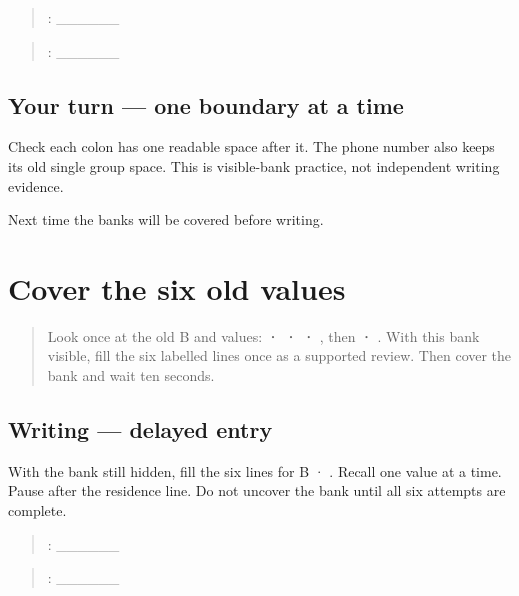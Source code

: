 \begin{quote}
: \_\_\_\_\_\_
\end{quote}

\begin{quote}
: \_\_\_\_\_\_
\end{quote}

\subsection*{Your turn — one boundary at a time}
Check each colon has one readable space after it. The phone number also keeps its old single group space. This is visible-bank practice, not independent writing evidence.

\begin{tcolorbox}[breakable,colback=teal!4,colframe=teal!35!black,title={Before you move on}]
Next time the banks will be covered before writing.
\end{tcolorbox}
\section[\texorpdfstring{\pa{ਨਾਂ}: · \pa{ਭਾਸ਼ਾ} … (delayed …)}{ਨਾਂ: · ਭਾਸ਼ਾ … (delayed …)}]{Cover the six old values}

\label{lesson:PA-W11-form-six-delayed}



\begin{quote}
Look once at the old B and  values: \textbf{ ·  ·  · }, then \textbf{ ·  }. With this bank visible, fill the six labelled lines once as a supported review. Then cover the bank and wait ten seconds.
\end{quote}

\subsection*{Writing — delayed entry}
With the bank still hidden, fill the six lines for B · . Recall one value at a time. Pause after the residence line. Do not uncover the bank until all six attempts are complete.

\begin{quote}
: \_\_\_\_\_\_
\end{quote}

\begin{quote}
: \_\_\_\_\_\_
\end{quote}

